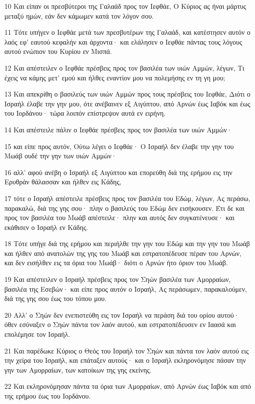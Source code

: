 \par 10 Και είπαν οι πρεσβύτεροι της Γαλαάδ προς τον Ιεφθάε, Ο Κύριος ας ήναι μάρτυς μεταξύ ημών, εάν δεν κάμωμεν κατά τον λόγον σου.
\par 11 Τότε υπήγεν ο Ιεφθάε μετά των πρεσβυτέρων της Γαλαάδ, και κατέστησεν αυτόν ο λαός εφ' εαυτού κεφαλήν και άρχοντα· και ελάλησεν ο Ιεφθάε πάντας τους λόγους αυτού ενώπιον του Κυρίου εν Μισπά.
\par 12 Και απέστειλεν ο Ιεφθάε πρέσβεις προς τον βασιλέα των υιών Αμμών, λέγων, Τι έχεις να κάμης μετ' εμού και ήλθες εναντίον μου να πολεμήσης εν τη γη μου;
\par 13 Και απεκρίθη ο βασιλεύς των υιών Αμμών προς τους πρέσβεις του Ιεφθάε, Διότι ο Ισραήλ έλαβε την γην μου, ότε ανέβαινεν εξ Αιγύπτου, από Αρνών έως Ιαβόκ και έως του Ιορδάνου· τώρα λοιπόν επίστρεψον αυτά εν ειρήνη.
\par 14 Και απέστειλε πάλιν ο Ιεφθάε πρέσβεις προς τον βασιλέα των υιών Αμμών·
\par 15 και είπε προς αυτόν, Ούτω λέγει ο Ιεφθάε· Ο Ισραήλ δεν έλαβε την γην του Μωάβ ουδέ την γην των υιών Αμμών·
\par 16 αλλ' αφού ανέβη ο Ισραήλ εξ Αιγύπτου και επορεύθη διά της ερήμου εις την Ερυθράν θάλασσαν και ήλθεν εις Κάδης,
\par 17 τότε ο Ισραήλ απέστειλε πρέσβεις προς τον βασιλέα του Εδώμ, λέγων, Ας περάσω, παρακαλώ, διά της γης σου· πλην ο βασιλεύς του Εδώμ δεν εισήκουσεν. Έτι δε και προς τον βασιλέα του Μωάβ απέστειλε· πλην και αυτός δεν συγκατένευσε· και εκάθισεν ο Ισραήλ εν Κάδης.
\par 18 Τότε υπήγε διά της ερήμου και περιήλθε την γην του Εδώμ και την γην του Μωάβ και ήλθεν από ανατολών της γης του Μωάβ και εστρατοπέδευσε πέραν του Αρνών, και δεν εισήλθεν εις τα όρια του Μωάβ· διότι ο Αρνών ήτο όριον του Μωάβ.
\par 19 Και απέστειλεν ο Ισραήλ πρέσβεις προς τον Σηών βασιλέα των Αμορραίων, βασιλέα της Εσεβών· και είπε προς αυτόν ο Ισραήλ, Ας περάσωμεν, παρακαλούμεν, διά της γης σου έως του τόπου μου.
\par 20 Αλλ' ο Σηών δεν ενεπιστεύθη εις τον Ισραήλ να περάση διά του ορίου αυτού· όθεν εσύναξεν ο Σηών πάντα τον λαόν αυτού, και εστρατοπέδευσεν εν Ιαασά και επολέμησε τον Ισραήλ.
\par 21 Και παρέδωκε Κύριος ο Θεός του Ισραήλ τον Σηών και πάντα τον λαόν αυτού εις την χείρα του Ισραήλ, και επάταξεν αυτούς· και ο Ισραήλ εκληρονόμησε πάσαν την γην των Αμορραίων, των κατοίκων της γης εκείνης.
\par 22 Και εκληρονόμησαν πάντα τα όρια των Αμορραίων, από Αρνών έως Ιαβόκ και από της ερήμου έως του Ιορδάνου.
